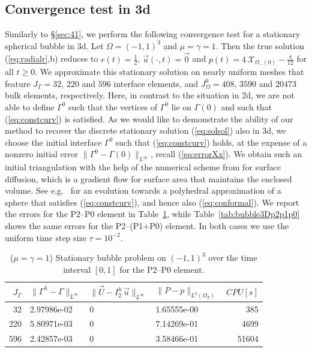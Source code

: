 \documentclass[a4paper,11pt,onecolumn]{article}
\newcommand{\bigchi}{\ensuremath{\mathrm{\mathcal{X}}}}
\newcommand{\charfcn}[1]{\bigchi_{#1}} %
\newcommand{\errorXx}{\|\Gamma^h - \Gamma\|_{L^\infty}}
\newcommand{\errorUu}[1]{\|\vec U - I^h_{#1}\,\vec u\|_{L^\infty}}
\newcommand{\LerrorPp}{\|P - p\|_{L^2(\Omega_T)}}
\begin{document}
\subsection{Convergence test in 3d} \label{sec:45}
Similarly to \S\ref{sec:41}, we perform the following convergence test for a
stationary spherical bubble in 3d. Let $\Omega = (-1,1)^3$ and
$\mu = \gamma = 1$. Then the true solution (\ref{eq:radialr},b) reduces to
$r(t) = \frac{1}{2}$, $\vec u(\cdot, t) = \vec 0$ and
$p(t) = 4\,\charfcn{\Omega_-(0)} - \frac{\pi}{12}$ for all $t\geq0$. We
approximate this stationary solution on nearly uniform meshes that feature
$J_\Gamma = 32$, $220$ and $596$ interface elements, and
$J_\Omega^0 = 408$, $3590$ and $20473$ bulk elements, respectively. Here, in
contrast to the situation in 2d, we are not able to define $\Gamma^0$
such that the vertices of $\Gamma^0$ lie on $\Gamma(0)$ and such that
(\ref{eq:constcurv}) is satisfied. As we would like to demonstrate the ability
of our method to recover the discrete stationary solution (\ref{eq:solsol})
also in 3d, we choose the initial interface $\Gamma^0$ such that
(\ref{eq:constcurv}) holds, at the expense of a nonzero initial error
$\| \Gamma^0 - \Gamma(0) \|_{L^\infty}$, recall (\ref{eq:errorXx}). We obtain
such an initial triangulation with the help of the numerical scheme from
\cite{gflows3d} for surface diffusion, which is a gradient flow for
surface area that maintains the enclosed volume. See
e.g.\ \cite[Fig.\ 11]{gflows3d} for an evolution towards a polyhedral
approximation of a sphere that satisfies (\ref{eq:constcurv}), and hence also
(\ref{eq:conformal}). We report the
errors for the P2--P0 element in Table~\ref{tab:bubble3Dp2p0}, while
Table~\ref{tab:bubble3Dp2p1p0} shows the same errors for the P2--(P1+P0)
element. In both cases we use the uniform time step size $\tau = 10^{-2}$.
\begin{table}
\center
\begin{tabular}{rlllr}
\hline
$J_\Gamma$ & $\errorXx$ & $\errorUu2$ & $\LerrorPp$ & $CPU[s]$ \\
\hline
 32 & 2.97986e-02 & 0 & 1.65555e-00 &   385 \\
220 & 5.80971e-03 & 0 & 7.14269e-01 &  4699 \\
596 & 2.42857e-03 & 0 & 3.58466e-01 & 51604 \\
\hline
\end{tabular}
\caption{($\mu=\gamma=1$) Stationary bubble problem on $(-1,1)^3$ over the time
interval $[0,1]$ for the P2--P0 element.}
\label{tab:bubble3Dp2p0}
\end{table}
\end{document}
